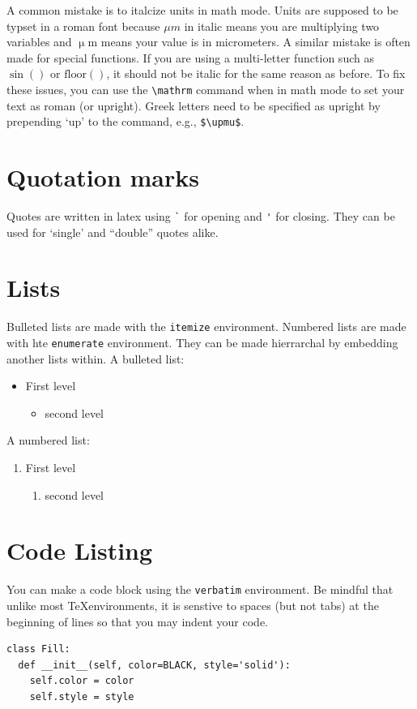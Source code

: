 A common mistake is to italcize units in math mode. Units are supposed to be typset in a roman font because $\mu m$ in italic means you are multiplying two variables and $\mathrm{\upmu m}$ means your value is in micrometers. A similar mistake is often made for special functions. If you are using a multi-letter function such as $\sin()$ or $\mathrm{floor}()$, it should not be italic for the same reason as before. To fix these issues, you can use the \texttt{\textbackslash mathrm} command when in math mode to set your text as roman (or upright). Greek letters need to be specified as upright by prepending `up' to the command, e.g., \texttt{\$\textbackslash upmu\$}.

\section*{Quotation marks}
Quotes are written in latex using \texttt{\`} for opening and \texttt{\'} for closing. They can be used for `single' and ``double'' quotes alike.

\section*{Lists}
Bulleted lists are made with the \texttt{itemize} environment. Numbered lists are made with hte \texttt{enumerate} environment. They can be made hierrarchal by embedding another lists within. A bulleted list:
\begin{itemize}
	\item First level
	\begin{itemize}
		\item second level
	\end{itemize}
\end{itemize}
A numbered list:
\begin{enumerate}
	\item First level
	\begin{enumerate}
		\item second level
	\end{enumerate}
\end{enumerate}

\section*{Code Listing}
You can make a code block using the \texttt{verbatim} environment. Be mindful that unlike most \TeX environments, it is senstive to spaces (but not tabs) at the beginning of lines so that you may indent your code.
\begin{verbatim}
class Fill:
  def __init__(self, color=BLACK, style='solid'):
    self.color = color
    self.style = style
\end{verbatim}

